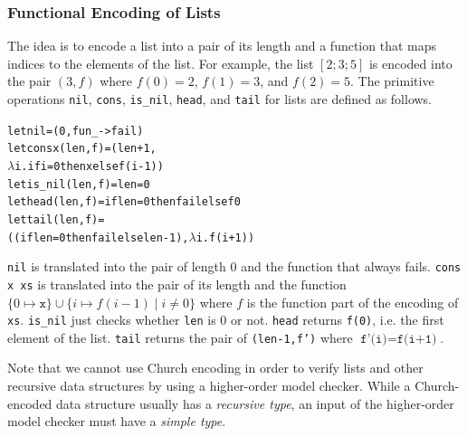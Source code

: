 \subsubsection{Functional Encoding of Lists}
\label{sec:list}

The idea is to encode a list into a pair of its length and a function that
maps indices to the elements of the list.  For example, the list
$[2;3;5]$ is encoded into the pair $(3,f)$ where $f(0) = 2$, $f(1) = 3$, and
$f(2) = 5$.  The primitive operations \texttt{nil}, \texttt{cons},
\texttt{is\_nil}, \texttt{head}, and \texttt{tail} for lists are defined
as follows.
\vspace{-5pt}
\begin{alltt}
 let nil = (0, fun _ -> fail)
 let cons x (len,f) = (len+1,
   \(\lambda\)i. if i = 0 then x else f (i-1))
 let is_nil (len,f) = len = 0
 let head (len,f) = if len=0 then fail else f 0
 let tail (len,f) =
   ((if len=0 then fail else len-1), \(\lambda\)i.f(i+1))
\end{alltt}
\vspace{-5pt}
\texttt{nil} is translated into the pair of length $0$ and the
function that always fails.  \texttt{cons x xs} is translated into the
pair of its length and the function $\{0 \mapsto \mathtt{x}\} \cup \{i \mapsto
f (i-1) \mid i \neq 0\}$ where $f$ is the function part of the encoding of
\texttt{xs}.  \texttt{is\_nil} just checks whether \texttt{len} is 0 or not.
\texttt{head} returns \texttt{f(0)}, i.e. the first
element of the list.  \texttt{tail} returns the pair of
\texttt{(len-1,f')} where $\texttt{f'(i)} = \texttt{f(i+1)}$.

Note that we cannot use Church encoding in order to
verify lists and other recursive data structures by using a higher-order
model checker.  While a Church-encoded data structure usually has a {\em recursive type},
an input of the higher-order model checker must have a {\em simple type}.




